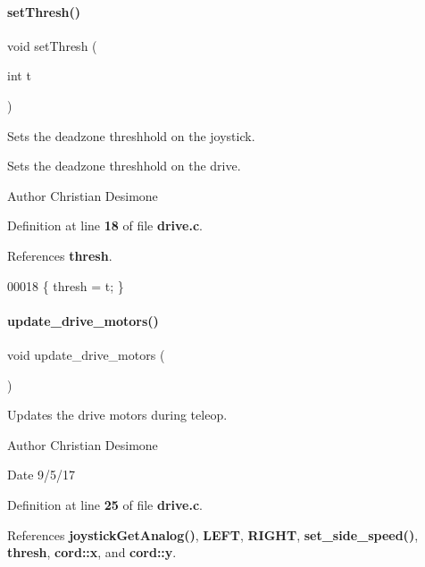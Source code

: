\paragraph{set\+Thresh()}
{\footnotesize\ttfamily void set\+Thresh (\begin{DoxyParamCaption}\item[{int}]{t }\end{DoxyParamCaption})}



Sets the deadzone threshhold on the joystick. 

Sets the deadzone threshhold on the drive.

\begin{DoxyAuthor}{Author}
Christian Desimone 
\end{DoxyAuthor}


Definition at line \textbf{ 18} of file \textbf{ drive.\+c}.



References \textbf{ thresh}.


\begin{DoxyCode}
00018 \{ thresh = t; \}
\end{DoxyCode}
\mbox{\label{drive_8c_a8224a4626a934d30ed587671b7004bf8}} 
\paragraph{update\+\_\+drive\+\_\+motors()}
{\footnotesize\ttfamily void update\+\_\+drive\+\_\+motors (\begin{DoxyParamCaption}{ }\end{DoxyParamCaption})}



Updates the drive motors during teleop. 

\begin{DoxyAuthor}{Author}
Christian Desimone 
\end{DoxyAuthor}
\begin{DoxyDate}{Date}
9/5/17 
\end{DoxyDate}


Definition at line \textbf{ 25} of file \textbf{ drive.\+c}.



References \textbf{ joystick\+Get\+Analog()}, \textbf{ L\+E\+FT}, \textbf{ R\+I\+G\+HT}, \textbf{ set\+\_\+side\+\_\+speed()}, \textbf{ thresh}, \textbf{ cord\+::x}, and \textbf{ cord\+::y}.



